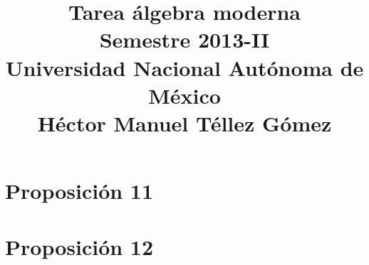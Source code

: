 \documentclass[a5paper,oneside]{amsart}
\title[Tarea álgebra moderna]{Tarea álgebra moderna\\ Semestre 2013-II\\ Universidad Nacional Autónoma de México\\ Héctor Manuel Téllez Gómez}
\theoremstyle{dotless}
\begin{document}
	\maketitle
    
	\section*{Proposición 11}
        
        
	\section*{Proposición 12}
        
\end{document}
